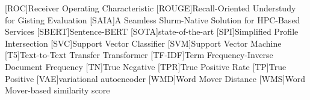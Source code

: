 \begin{acronym}[XXXXXXXXX]
    [ROC]{Receiver Operating Characteristic}
    [ROUGE]{Recall-Oriented Understudy for Gisting Evaluation}
    [SAIA]{A Seamless Slurm-Native Solution for HPC-Based Services}
    [SBERT]{Sentence-BERT}
    [SOTA]{state-of-the-art}
    [SPI]{Simplified Profile Intersection}
    [SVC]{Support Vector Classifier}
    [SVM]{Support Vector Machine}
    [T5]{Text-to-Text Transfer Transformer}
    [TF-IDF]{Term Frequency-Inverse Document Frequency}
    [TN]{True Negative}
    [TPR]{True Positive Rate}
    [TP]{True Positive}
    [VAE]{variational autoencoder}
    [WMD]{Word Mover Distance}
    [WMS]{Word Mover-based similarity score}
\end{acronym}
